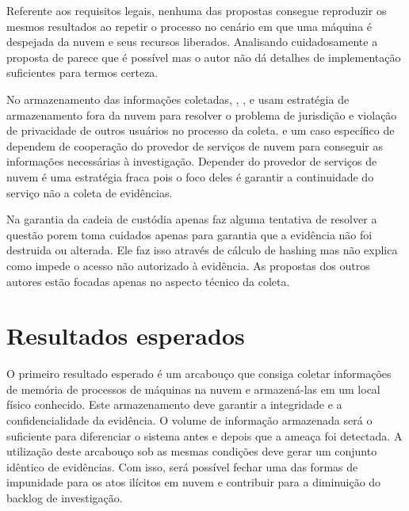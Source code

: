 \documentclass[12pt,				%
	openright,			%
	oneside,			%
	a4paper,			%
	english,			%
	brazil				%
	]{abntex2}
\begin{document}
Referente aos requisitos legais, nenhuma das propostas consegue reproduzir os mesmos resultados ao repetir o processo no cenário em que uma máquina é despejada da nuvem e seus 
recursos liberados. Analisando cuidadosamente a proposta de \cite{George2012} parece que é possível mas o autor não dá detalhes de implementação suficientes para termos certeza.

No armazenamento das informações coletadas, \cite{Reichert2015}, \cite{George2012}, \cite{Poisel2013} e \cite{Dykstra2013} usam estratégia de armazenamento fora da nuvem para 
resolver o problema de jurisdição e violação de privacidade de outros usuários no processo da coleta. \cite{Sang2013} e um caso específico de \cite{George2012} dependem de 
cooperação do provedor de serviços de nuvem para conseguir as informações necessárias à investigação. Depender do provedor de serviços de nuvem é uma estratégia fraca pois o foco
deles é garantir a continuidade do serviço não a coleta de evidências. 

Na garantia da cadeia de custódia apenas \cite{Sang2013} faz alguma tentativa de resolver a questão porem toma cuidados apenas para  garantia que a evidência não foi destruida 
ou alterada. Ele faz isso através de cálculo de hashing mas não explica como impede o acesso não autorizado à evidência. As propostas dos outros autores estão focadas apenas no 
aspecto técnico da coleta.

\chapter{Resultados esperados} \label{chap:result}
O primeiro resultado esperado é um arcabouço que consiga coletar informações de memória de processos de máquinas na nuvem e armazená-las em um local físico conhecido.
Este armazenamento deve garantir a integridade e a confidencialidade da evidência. O volume de informação armazenada será o suficiente para diferenciar o sistema antes 
e depois que a ameaça foi detectada. A utilização deste arcabouço sob as mesmas condições deve gerar um conjunto idêntico de evidências. Com isso, será possível fechar 
uma das formas de impunidade para os atos ilícitos em nuvem e contribuir para a diminuição do backlog de investigação.



\postextual

%  

\begin{comment}
\printindex
\end{comment}

\end{document}
